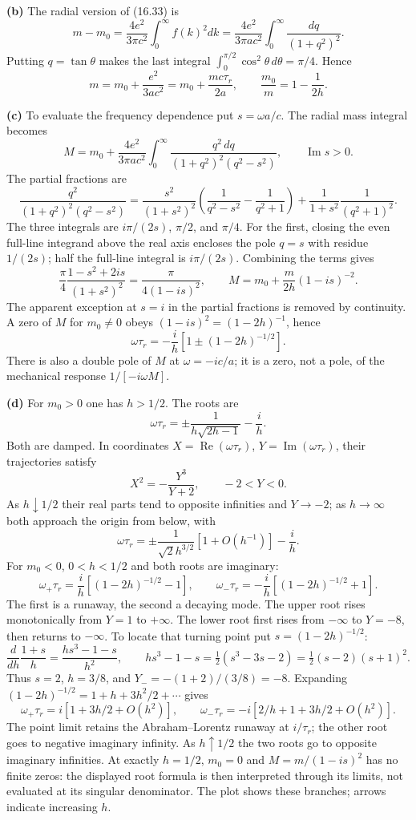 \textbf{(b)} The radial version of (16.33) is
\[
m-m_0=\frac{4e^2}{3\pi c^2}\int_0^\infty f(k)^2dk
=\frac{4e^2}{3\pi ac^2}\int_0^\infty\frac{dq}{(1+q^2)^2}.
\]
Putting $q=\tan\theta$ makes the last integral
$\int_0^{\pi/2}\cos^2\theta\,d\theta=\pi/4$. Hence
\[
\boxed{m=m_0+\frac{e^2}{3ac^2}
=m_0+\frac{mc\tau_r}{2a},\qquad \frac{m_0}{m}=1-\frac1{2h}.}
\]

\textbf{(c)} To evaluate the frequency dependence put $s=\omega a/c$.
The radial mass integral becomes
\[
M=m_0+\frac{4e^2}{3\pi ac^2}
\int_0^\infty\frac{q^2\,dq}{(1+q^2)^2(q^2-s^2)},\qquad \operatorname{Im}s>0.
\]
The partial fractions are
\[
\frac{q^2}{(1+q^2)^2(q^2-s^2)}
=\frac{s^2}{(1+s^2)^2}\left(\frac1{q^2-s^2}-\frac1{q^2+1}\right)
+\frac1{1+s^2}\frac1{(q^2+1)^2}.
\]
The three integrals are $i\pi/(2s)$, $\pi/2$, and $\pi/4$.
For the first, closing the even full-line integrand above the real axis
encloses the pole $q=s$ with residue $1/(2s)$; half the full-line
integral is $i\pi/(2s)$.
Combining the terms gives
\[
\frac\pi4\frac{1-s^2+2is}{(1+s^2)^2}
=\frac\pi{4(1-is)^2},\qquad
\boxed{M=m_0+\frac{m}{2h}(1-is)^{-2}.}
\]
The apparent exception at $s=i$ in the partial fractions is removed
by continuity. A zero of $M$ for $m_0\ne0$ obeys
$(1-is)^2=(1-2h)^{-1}$, hence
\[
\boxed{\omega\tau_r=-\frac i h
\left[1\pm(1-2h)^{-1/2}\right].}
\]
There is also a double pole of $M$ at $\omega=-ic/a$; it is a zero,
not a pole, of the mechanical response $1/[-i\omega M]$.

\textbf{(d)} For $m_0>0$ one has $h>1/2$. The roots are
\[
\omega\tau_r=\pm\frac1{h\sqrt{2h-1}}-\frac i h.
\]
Both are damped. In coordinates $X=\operatorname{Re}(\omega\tau_r)$,
$Y=\operatorname{Im}(\omega\tau_r)$, their trajectories satisfy
\[
X^2=-\frac{Y^3}{Y+2},\qquad -2<Y<0.
\]
As $h\downarrow1/2$ their real parts tend to opposite infinities and
$Y\to-2$; as $h\to\infty$ both approach the origin from below, with
\[
\omega\tau_r=\pm\frac1{\sqrt2h^{3/2}}[1+O(h^{-1})]-\frac i h.
\]
For $m_0<0$, $0<h<1/2$ and both roots are imaginary:
\[
\omega_+\tau_r=\frac i h[(1-2h)^{-1/2}-1],\qquad
\omega_-\tau_r=-\frac i h[(1-2h)^{-1/2}+1].
\]
The first is a runaway, the second a decaying mode.
The upper root rises monotonically from $Y=1$ to $+\infty$.
The lower root first rises from $-\infty$ to $Y=-8$, then returns
to $-\infty$. To locate that turning point put
$s=(1-2h)^{-1/2}$:
\[
\frac d{dh}\frac{1+s}{h}
=\frac{hs^3-1-s}{h^2},\qquad
hs^3-1-s=\tfrac12(s^3-3s-2)
=\tfrac12(s-2)(s+1)^2.
\]
Thus $s=2$, $h=3/8$, and $Y_-=-(1+2)/(3/8)=-8$.
Expanding
$(1-2h)^{-1/2}=1+h+3h^2/2+\cdots$ gives
\[
\omega_+\tau_r=i[1+3h/2+O(h^2)],\qquad
\omega_-\tau_r=-i[2/h+1+3h/2+O(h^2)].
\]
The point limit retains the Abraham--Lorentz runaway at $i/\tau_r$;
the other root goes to negative imaginary infinity. As $h\uparrow1/2$
the two roots go to opposite imaginary infinities. At exactly $h=1/2$,
$m_0=0$ and $M=m/(1-is)^2$ has no finite zeros: the displayed root
formula is then interpreted through its limits, not evaluated at its
singular denominator. The plot shows these branches; arrows indicate
increasing $h$.
\begin{center}\end{center}

